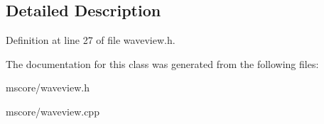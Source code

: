 \subsection{Detailed Description}


Definition at line 27 of file waveview.\+h.



The documentation for this class was generated from the following files\+:\begin{DoxyCompactItemize}
\item 
mscore/waveview.\+h\item 
mscore/waveview.\+cpp\end{DoxyCompactItemize}
